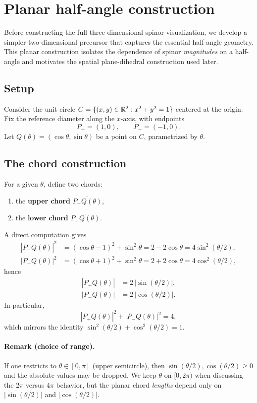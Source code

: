 \section{\label{sec:planar} Planar half-angle construction}

Before constructing the full three-dimensional spinor visualization, we develop a simpler two-dimensional precursor that captures the essential half-angle geometry. This planar construction isolates the dependence of spinor \emph{magnitudes} on a half-angle and motivates the spatial plane-dihedral construction used later.

\subsection{Setup}
\label{sec:planar_setup}

Consider the unit circle $C=\{(x,y)\in\mathbb{R}^2:x^2+y^2=1\}$ centered at the origin. Fix the reference diameter along the $x$-axis, with endpoints
\[
P_+=(1,0),\qquad P_-=(-1,0).
\]
Let $Q(\theta)=(\cos\theta,\sin\theta)$ be a point on $C$, parametrized by $\theta$.

\subsection{The chord construction}
\label{sec:planar_chords}

For a given $\theta$, define two chords:
\begin{enumerate}
    \item the \textbf{upper chord} $\overline{P_+Q(\theta)}$,
    \item the \textbf{lower chord} $\overline{P_-Q(\theta)}$.
\end{enumerate}
A direct computation gives
\begin{align}
    |P_+Q(\theta)|^2 &= (\cos\theta-1)^2+\sin^2\theta = 2-2\cos\theta = 4\sin^2(\theta/2), \\
    |P_-Q(\theta)|^2 &= (\cos\theta+1)^2+\sin^2\theta = 2+2\cos\theta = 4\cos^2(\theta/2),
\end{align}
hence
\begin{align}
    |P_+Q(\theta)| &= 2\,|\sin(\theta/2)|, \\
    |P_-Q(\theta)| &= 2\,|\cos(\theta/2)|.
\end{align}
In particular,
\[
|P_+Q(\theta)|^2+|P_-Q(\theta)|^2=4,
\]
which mirrors the identity $\sin^2(\theta/2)+\cos^2(\theta/2)=1$.

\paragraph{Remark (choice of range).}
If one restricts to $\theta\in[0,\pi]$ (upper semicircle), then $\sin(\theta/2),\cos(\theta/2)\ge 0$ and the absolute values may be dropped. We keep $\theta$ on $[0,2\pi)$ when discussing the $2\pi$ versus $4\pi$ behavior, but the planar chord \emph{lengths} depend only on $|\sin(\theta/2)|$ and $|\cos(\theta/2)|$.

